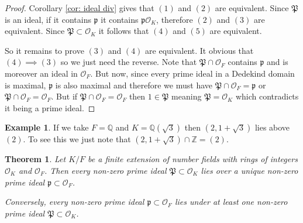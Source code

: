 \documentclass[11pt,a4paper]{report}
\theoremstyle{plain}
\newtheorem{theorem}[subsection]{Theorem}
\theoremstyle{definition}
\newtheorem{exmp}[subsection]{Example}
\theoremstyle{definition}
\newcommand{\ZZ}{\mathbb{Z}}
\def\QQ{\mathbb{Q}}
\def \gothP{\mathfrak{P}}
\def\gothp{\mathfrak{p}}
\def \OO {\mathcal{O}}
\begin{document}
	\begin{proof}
		Corollary \ref{cor: ideal div} gives that $(1)$ and $(2)$ are equivalent. Since $\gothP$ is an ideal, if it contains $\gothp$ it contains $\gothp\OO_K$, therefore $(2)$ and $(3)$ are equivalent. Since $\mathfrak{P} \subset \OO_K$ it follows that $(4)$ and $(5)$ are equivalent.
		
		So it remains to prove $(3)$ and $(4)$ are equivalent. It obvious that $(4) \implies (3)$ so we just need the reverse. Note that $\mathfrak{P} \cap \OO_F$ contains $\gothp$ and is moreover an ideal in $\OO_F$. But now, since every prime ideal in a Dedekind domain is maximal, $\gothp$ is also maximal and therefore we must have $\mathfrak{P} \cap \OO_F=\gothp$ or $ \mathfrak{P} \cap \OO_F=\OO_F$. But if $ \mathfrak{P} \cap \OO_F=\OO_F$ then $1 \in \mathfrak{P}$ meaning $\mathfrak{P}=\OO_K$ which contradicts it being a prime ideal.
	\end{proof}
	
	\begin{exmp}
		If we take $F=\QQ$ and $K=\QQ(\sqrt{3})$ then $(2,1+\sqrt{3})$ lies above $(2)$. To see this we just note that $(2,1+\sqrt{3}) \cap \ZZ=(2)$.
	\end{exmp}
	
	
	\begin{theorem}
		Let $K/F$ be a finite extension of number fields with rings of integers $\OO_K$ and $\OO_F$. Then every non-zero prime ideal $\gothP \subset \OO_K$ lies over a unique non-zero prime ideal $\gothp \subset \OO_F$. 
		
		Conversely, every non-zero prime ideal $\gothp \subset \OO_F$ lies under at least one non-zero prime ideal $\gothP \subset \OO_K$.
	\end{theorem}
	
\end{document}
